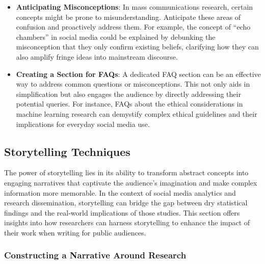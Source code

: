 \documentclass[
]{book}
\begin{document}
\begin{itemize}
\item
  \textbf{Anticipating Misconceptions}: In mass communications research, certain concepts might be prone to misunderstanding. Anticipate these areas of confusion and proactively address them. For example, the concept of ``echo chambers'' in social media could be explained by debunking the misconception that they only confirm existing beliefs, clarifying how they can also amplify fringe ideas into mainstream discourse.
\item
  \textbf{Creating a Section for FAQs}: A dedicated FAQ section can be an effective way to address common questions or misconceptions. This not only aids in simplification but also engages the audience by directly addressing their potential queries. For instance, FAQs about the ethical considerations in machine learning research can demystify complex ethical guidelines and their implications for everyday social media use.
\end{itemize}

\hypertarget{storytelling-techniques}{%
\subsection*{Storytelling Techniques}\label{storytelling-techniques}}

The power of storytelling lies in its ability to transform abstract concepts into engaging narratives that captivate the audience's imagination and make complex information more memorable. In the context of social media analytics and research dissemination, storytelling can bridge the gap between dry statistical findings and the real-world implications of those studies. This section offers insights into how researchers can harness storytelling to enhance the impact of their work when writing for public audiences.

\hypertarget{constructing-a-narrative-around-research}{%
\subsubsection{Constructing a Narrative Around Research}\label{constructing-a-narrative-around-research}}
\end{document}

